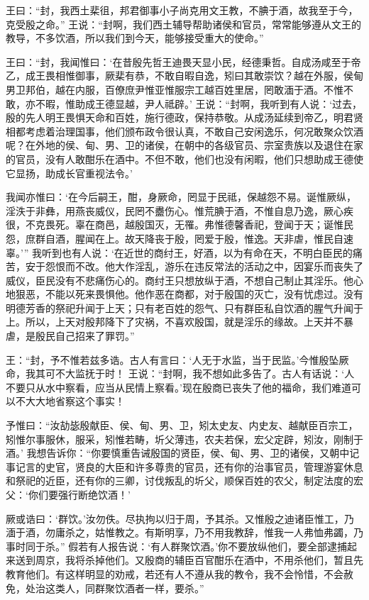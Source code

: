 \documentclass[12pt,UTF8]{ctexbook}
\begin{document}
王曰：“封，我西土棐徂，邦君御事小子尚克用文王教，不腆于酒，故我至于今，克受殷之命。”
王说：“封啊，我们西土辅导帮助诸侯和官员，常常能够遵从文王的教导，不多饮酒，所以我们到今天，能够接受重大的使命。”

王曰：“封，我闻惟曰：‘在昔殷先哲王迪畏天显小民，经德秉哲。自成汤咸至于帝乙，成王畏相惟御事，厥棐有恭，不敢自暇自逸，矧曰其敢崇饮？越在外服，侯甸男卫邦伯，越在内服，百僚庶尹惟亚惟服宗工越百姓里居，罔敢湎于酒。不惟不敢，亦不暇，惟助成王德显越，尹人祗辟。’
王说：“封啊，我听到有人说：‘过去，殷的先人明王畏惧天命和百姓，施行德政，保持恭敬。从成汤延续到帝乙，明君贤相都考虑着治理国事，他们颁布政令很认真，不敢自己安闲逸乐，何况敢聚众饮酒呢？在外地的侯、甸、男、卫的诸侯，在朝中的各级官员、宗室贵族以及退住在家的官员，没有人敢酣乐在酒中。不但不敢，他们也没有闲暇，他们只想助成王德使它显扬，助成长官重视法令。’

我闻亦惟曰：‘在今后嗣王，酣，身厥命，罔显于民祗，保越怨不易。诞惟厥纵，淫泆于非彝，用燕丧威仪，民罔不衋伤心。惟荒腆于酒，不惟自息乃逸，厥心疾很，不克畏死。辜在商邑，越殷国灭，无罹。弗惟德馨香祀，登闻于天；诞惟民怨，庶群自酒，腥闻在上。故天降丧于殷，罔爱于殷，惟逸。天非虐，惟民自速辜。’”
我听到也有人说：‘在近世的商纣王，好酒，以为有命在天，不明白臣民的痛苦，安于怨恨而不改。他大作淫乱，游乐在违反常法的活动之中，因宴乐而丧失了威仪，臣民没有不悲痛伤心的。商纣王只想放纵于酒，不想自己制止其淫乐。他心地狠恶，不能以死来畏惧他。他作恶在商都，对于殷国的灭亡，没有忧虑过。没有明德芳香的祭祀升闻于上天；只有老百姓的怨气、只有群臣私自饮酒的腥气升闻于上。所以，上天对殷邦降下了灾祸，不喜欢殷国，就是淫乐的缘故。上天并不暴虐，是殷民自己招来了罪罚。”

王：“封，予不惟若兹多诰。古人有言曰：‘人无于水监，当于民监。’今惟殷坠厥命，我其可不大监抚于时！
王说：“封啊，我不想如此多告了。古人有话说：‘人不要只从水中察看，应当从民情上察看。’现在殷商已丧失了他的福命，我们难道可以不大大地省察这个事实！

予惟曰：“汝劼毖殷献臣、侯、甸、男、卫，矧太史友、内史友、越献臣百宗工，矧惟尔事服休，服采，矧惟若畴，圻父薄违，农夫若保，宏父定辟，矧汝，刚制于酒。’
我想告诉你：“你要慎重告诫殷国的贤臣，侯、甸、男、卫的诸侯，又朝中记事记言的史官，贤良的大臣和许多尊贵的官员，还有你的治事官员，管理游宴休息和祭祀的近臣，还有你的三卿，讨伐叛乱的圻父，顺保百姓的农父，制定法度的宏父：‘你们要强行断绝饮酒！’

厥或诰曰：‘群饮。’汝勿佚。尽执拘以归于周，予其杀。又惟殷之迪诸臣惟工，乃湎于酒，勿庸杀之，姑惟教之。有斯明享，乃不用我教辞，惟我一人弗恤弗蠲，乃事时同于杀。”
假若有人报告说：‘有人群聚饮酒。’你不要放纵他们，要全部逮捕起来送到周京，我将杀掉他们。又殷商的辅臣百官酣乐在酒中，不用杀他们，暂且先教育他们。有这样明显的劝戒，若还有人不遵从我的教令，我不会怜惜，不会赦免，处治这类人，同群聚饮酒者一样，要杀。”
\end{document}
